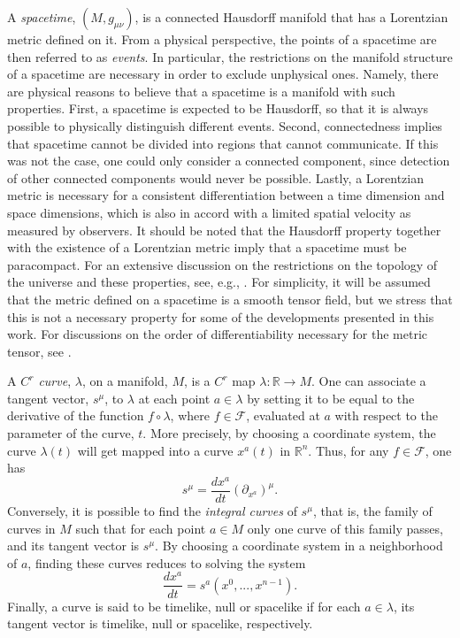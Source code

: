 \documentclass[
12pt,		%
openright,	%
twoside,  %
a4paper,			%
chapter=TITLE,		%
english,			%
french,				%
spanish,			%
brazil				%
]{USPSC-classe/USPSC}
\begin{document}
\begin{apendicesenv}
A \textit{spacetime}, $(M,g_{\mu\nu})$, is a connected Hausdorff manifold that has a Lorentzian metric defined on it. From a physical perspective, the points of a spacetime are then referred to as \textit{events}. In particular, the restrictions on the manifold structure of a spacetime are necessary in order to exclude unphysical ones. Namely, there are physical reasons to believe that a spacetime is a manifold with such properties. First, a spacetime is expected to be Hausdorff, so that it is always possible to physically distinguish different events. Second, connectedness implies that spacetime cannot be divided into regions that cannot communicate. If this was not the case, one could only consider a connected component, since detection of other connected components would never be possible. Lastly, a Lorentzian metric is necessary for a consistent differentiation between a time dimension and space dimensions, which is also in accord with a limited spatial velocity as measured by observers. It should be noted that the Hausdorff property together with the existence of a Lorentzian metric imply that a spacetime must be paracompact. For an extensive discussion on the restrictions on the topology of the universe and these properties, see, e.g., \cite{Geroch1979}. For simplicity, it will be assumed that the metric defined on a spacetime is a smooth tensor field, but we stress that this is not a necessary property for some of the developments presented in this work. For discussions on the order of differentiability necessary for the metric tensor, see \cite{Hawking1973}. 

A \textit{$C^r$ curve}, $\lambda$, on a manifold, $M$, is a $C^{r}$ map $\lambda:\mathbb{R}\to M$. One can associate a tangent vector, $s^{\mu}$, to $\lambda$ at each point $a\in \lambda$ by setting it to be equal to the derivative of the function $f\circ\lambda$, where $f\in\mathcal{F}$, evaluated at $a$ with respect to the parameter of the curve, $t$. More precisely, by choosing a coordinate system, the curve $\lambda(t)$ will get mapped into a curve $x^{a}(t)$ in $\mathbb{R}^n$. Thus, for any $f\in\mathcal{F}$, one has
\begin{equation}\label{aeq100}
    s^{\mu}=\frac{dx^{a}}{dt}(\partial_{x^a})^{\mu}.
\end{equation}
Conversely, it is possible to find the \textit{integral curves} of $s^{\mu}$, that is, the family of curves in $M$ such that for each point $a\in M$ only one curve of this family passes, and its tangent vector is $s^{\mu}$. By choosing a coordinate system in a neighborhood of $a$, finding these curves reduces to solving the system 
\begin{equation}
    \frac{dx^{a}}{dt}=s^a(x^0,...,x^{n-1}).
\end{equation}
Finally, a curve is said to be timelike, null or spacelike if for each $a\in \lambda$, its tangent vector is timelike, null or spacelike, respectively.


\end{apendicesenv}
\end{document}
